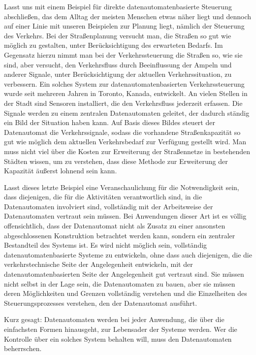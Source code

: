 {Lasst uns mit einem Beispiel für direkte datenautomatenbasierte Steuerung abschließen, das dem Alltag der meisten Menschen etwas näher liegt und dennoch auf einer Linie mit unseren Beispielen zur Planung liegt, nämlich der Steuerung des Verkehrs. Bei der Straßenplanung versucht man, die Straßen so gut wie möglich zu gestalten, unter Berücksichtigung des erwarteten Bedarfs. Im Gegensatz hierzu nimmt man bei der Verkehrssteuerung die Straßen so, wie sie sind, aber versucht, den Verkehrsfluss durch Beeinflussung der Ampeln und anderer Signale, unter Berücksichtigung der aktuellen Verkehrssituation, zu verbessern. Ein solches System zur datenautomatenbasierten Verkehrssteuerung wurde seit mehreren Jahren in Toronto, Kanada, entwickelt. An vielen Stellen in der Stadt sind Sensoren installiert, die den Verkehrsfluss jederzeit erfassen. Die Signale werden zu einem zentralen Datenautomaten geleitet, der dadurch ständig ein Bild der Situation haben kann. Auf Basis dieses Bildes steuert der Datenautomat die Verkehrssignale, sodass die vorhandene Straßenkapazität so gut wie möglich dem aktuellen Verkehrsbedarf zur Verfügung gestellt wird. Man muss nicht viel über die Kosten zur Erweiterung der Straßennetze in bestehenden Städten wissen, um zu verstehen, dass diese Methode zur Erweiterung der Kapazität äußerst lohnend sein kann.

Lasst dieses letzte Beispiel eine Veranschaulichung für die Notwendigkeit sein, dass diejenigen, die für die Aktivitäten verantwortlich sind, in die Datenautomaten involviert sind, vollständig mit der Arbeitsweise der Datenautomaten vertraut sein müssen. Bei Anwendungen dieser Art ist es völlig offensichtlich, dass der Datenautomat nicht als Zusatz zu einer ansonsten abgeschlossenen Konstruktion betrachtet werden kann, sondern ein zentraler Bestandteil des Systems ist. Es wird nicht möglich sein, vollständig datenautomatenbasierte Systeme zu entwickeln, ohne dass auch diejenigen, die die verkehrstechnische Seite der Angelegenheit entwickeln, mit der datenautomatenbasierten Seite der Angelegenheit gut vertraut sind. Sie müssen nicht selbst in der Lage sein, die Datenautomaten zu bauen, aber sie müssen deren Möglichkeiten und Grenzen vollständig verstehen und die Einzelheiten des Steuerungsprozesses verstehen, den der Datenautomat ausführt.

Kurz gesagt: Datenautomaten werden bei jeder Anwendung, die über die einfachsten Formen hinausgeht, zur Lebensader der Systeme werden. Wer die Kontrolle über ein solches System behalten will, muss den Datenautomaten beherrschen.
}





